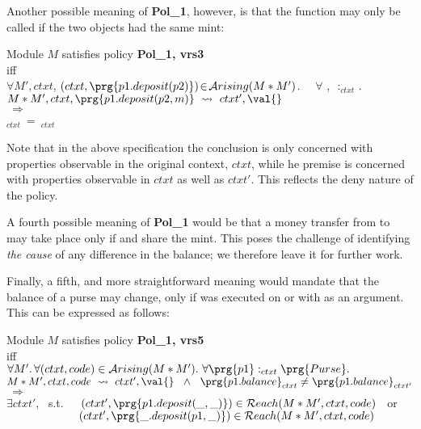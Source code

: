 Another possible meaning of  {\bf Pol\_1}, however, is that the function  may only be called if the two objects had the same mint:
\begin{shaded}
\begin{center}
Module $M$ satisfies policy {\bf Pol\_1, vrs3} \\ iff
\\
$\forall  M', ctxt$, $(ctxt, \prg{p1.deposit(p2)})\!\in\!{\mathcal A}rising(M*M')$. \ \ $\forall$ ,\, \,:$_{ctxt}$ .\\
$ M*M',  ctxt, \prg{p1.deposit(p2,m)} \ \leadsto \ ctxt', \val{}$ \\
$ \ \Rightarrow\ $
\\
$_{ctxt}$\  =\ $_{ctxt}$ 
 \end{center}
\end{shaded}

\noindent
Note that in the above specification the conclusion is only concerned with properties observable in the original context, $ctxt$, while he premise is concerned with properties observable in $ctxt$ as well as $ctxt'$. This reflects the deny nature of the policy.

A fourth possible meaning of {\bf Pol\_1} would be that  a money transfer from  to  may take place only if  and  share the   mint.  This poses the  challenge of identifying {\em the cause} of any difference in the balance; we therefore leave it for further work.  

Finally, a fifth, and more straightforward meaning would mandate that the balance of a purse  may change, only 
if  was executed on  or with  as an argument. This can be expressed as follows:

\begin{shaded}
\begin{center}
Module $M$ satisfies policy {\bf Pol\_1, vrs5} \\ iff
\\
$\forall M'. \, \forall (ctxt, code)\in{\mathcal A}rising(M*M'). \ \forall  \prg{p1} :_{ctxt} \prg{Purse}.$
\\
$M*M', ctxt,code \ \leadsto\  ctxt',\val{}\ \ \wedge \ \  \prg{p1.balance}_{ctxt} \neq  \prg{p1.balance}_{ctxt'}$
\\
$ \ \Rightarrow\ $
\\
$\exists  ctxt'$, \ s.t.$ \ \ \ \ \ $ $(ctxt', \prg{p1.deposit(\_,\_)})\in{\mathcal R}each(M*M',ctxt,code)$ \ or \\
  $  ~ \ \ \ \ \  \ \ \ \ \ \ \ \  \ \ \ \ \  (ctxt',\prg{ \_.deposit(p1,\_)})\in{\mathcal R}each(M*M',ctxt,code)$ 
 \end{center}
\end{shaded}

